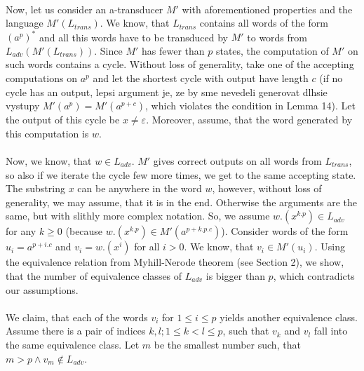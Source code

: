 \paragraph{}
Now, let us consider an a-transducer $M'$ with aforementioned properties and the language $M'(L_{trans})$. We know, that $L_{trans}$ contains all words of the form $(a^p)^*$ and all this words have to be transduced by $M'$ to words from $L_{adv} (M'(L_{trans}))$. Since $M'$ has fewer than $p$ states, the computation of $M'$ on such words contains a cycle. Without loss of generality, take one of the accepting computations on $a^p$ and let the shortest cycle with output have length $c$ (if no cycle has an output, \color{red}lepsi argument je, ze by sme nevedeli generovat dlhsie vystupy\color{black} $M'(a^p) = M'(a^{p+c})$, which violates the condition in Lemma 14). Let the output of this cycle be $x \neq \varepsilon$. Moreover, assume, that the word generated by this computation is $w$.

\paragraph{}
Now, we know, that $w \in L_{adv}$. $M'$ gives correct outputs on all words from $L_{trans}$, so also if we iterate the cycle few more times, we get to the same accepting state.  The substring $x$ can be anywhere in the word $w$, however, without loss of generality, we may assume, that it is in the end. Otherwise the arguments are the same, but with slithly more complex notation. So, we assume $w.(x^{k.p}) \in L_{adv}$ for any $k \geq 0$ (because $w.(x^{k.p}) \in M'(a^{p+k.p.c})$). Consider words of the form $u_i = a^{p+i.c}$ and $v_i = w.(x^i)$ for all $i > 0$. We know, that $v_i \in M'(u_i)$. Using the equivalence relation from Myhill-Nerode theorem (see Section 2), we show, that the number of equivalence classes of $L_{adv}$ is bigger than $p$, which contradicts our assumptions.

\paragraph{}
We claim, that each of the words $v_i$ for $1 \leq i \leq p$ yields another equivalence class. Assume there is a pair of indices $k,l; 1 \leq k < l \leq p$, such that $v_k$ and $v_l$ fall into the same equivalence class. Let $m$ be the smallest number such, that $m>p \wedge v_m \notin L_{adv}$.

